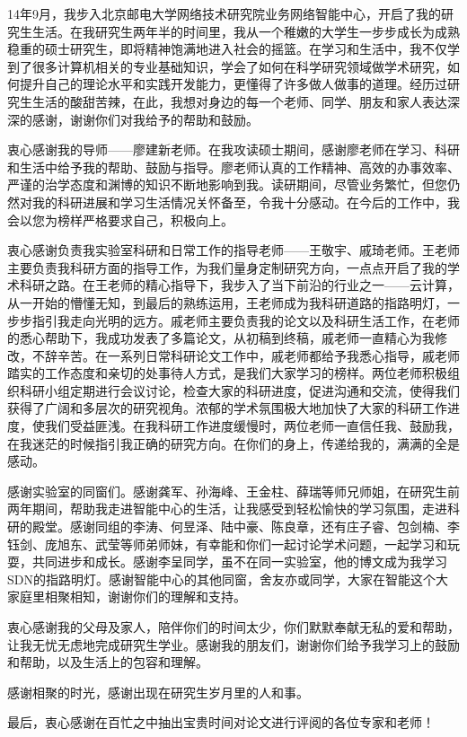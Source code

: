 
\begin{acknowledgement}
14年9月，我步入北京邮电大学网络技术研究院业务网络智能中心，开启了我的研究生生活。在我研究生两年半的时间里，我从一个稚嫩的大学生一步步成长为成熟稳重的硕士研究生，即将精神饱满地进入社会的摇篮。在学习和生活中，我不仅学到了很多计算机相关的专业基础知识，学会了如何在科学研究领域做学术研究，如何提升自己的理论水平和实践开发能力，更懂得了许多做人做事的道理。经历过研究生生活的酸甜苦辣，在此，我想对身边的每一个老师、同学、朋友和家人表达深深的感谢，谢谢你们对我给予的帮助和鼓励。

衷心感谢我的导师——廖建新老师。在我攻读硕士期间，感谢廖老师在学习、科研和生活中给予我的帮助、鼓励与指导。廖老师认真的工作精神、高效的办事效率、严谨的治学态度和渊博的知识不断地影响到我。读研期间，尽管业务繁忙，但您仍然对我的科研进展和学习生活情况关怀备至，令我十分感动。在今后的工作中，我会以您为榜样严格要求自己，积极向上。

衷心感谢负责我实验室科研和日常工作的指导老师——王敬宇、戚琦老师。王老师主要负责我科研方面的指导工作，为我们量身定制研究方向，一点点开启了我的学术科研之路。在王老师的精心指导下，我步入了当下前沿的行业之一——云计算，从一开始的懵懂无知，到最后的熟练运用，王老师成为我科研道路的指路明灯，一步步指引我走向光明的远方。戚老师主要负责我的论文以及科研生活工作，在老师的悉心帮助下，我成功发表了多篇论文，从初稿到终稿，戚老师一直精心为我修改，不辞辛苦。在一系列日常科研论文工作中，戚老师都给予我悉心指导，戚老师踏实的工作态度和亲切的处事待人方式，是我们大家学习的榜样。两位老师积极组织科研小组定期进行会议讨论，检查大家的科研进度，促进沟通和交流，使得我们获得了广阔和多层次的研究视角。浓郁的学术氛围极大地加快了大家的科研工作进度，使我们受益匪浅。在我科研工作进度缓慢时，两位老师一直信任我、鼓励我，在我迷茫的时候指引我正确的研究方向。在你们的身上，传递给我的，满满的全是感动。

感谢实验室的同窗们。感谢龚军、孙海峰、王金柱、薛瑞等师兄师姐，在研究生前两年期间，帮助我走进智能中心的生活，让我感受到轻松愉快的学习氛围，走进科研的殿堂。感谢同组的李涛、何昱泽、陆中豪、陈良章，还有庄子睿、包剑楠、李钰剑、庞旭东、武莹等师弟师妹，有幸能和你们一起讨论学术问题，一起学习和玩耍，共同进步和成长。感谢李呈同学，虽不在同一实验室，他的博文成为我学习SDN的指路明灯。感谢智能中心的其他同窗，舍友亦或同学，大家在智能这个大家庭里相聚相知，谢谢你们的理解和支持。

衷心感谢我的父母及家人，陪伴你们的时间太少，你们默默奉献无私的爱和帮助，让我无忧无虑地完成研究生学业。感谢我的朋友们，谢谢你们给予我学习上的鼓励和帮助，以及生活上的包容和理解。

感谢相聚的时光，感谢出现在研究生岁月里的人和事。

最后，衷心感谢在百忙之中抽出宝贵时间对论文进行评阅的各位专家和老师！

\end{acknowledgement}

